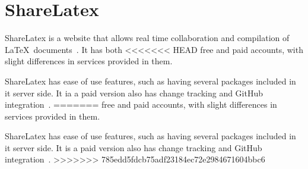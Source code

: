 \section{ShareLatex}

ShareLatex is a website that allows real time collaboration and compilation
of \LaTeX~documents~\cite{www-hid-sp18-601-slatex-documentation}. It has both 
<<<<<<< HEAD
free and paid accounts, with slight differences
 in services provided in them.
 
ShareLatex has ease of use features, such as having several packages included 
in it server side. It ia a paid version also has change tracking and GitHub
integration~\cite{www-hid-sp18-601-slatex-plans}.
=======
free and paid accounts, with slight differences in services provided in them.
 
ShareLatex has ease of use features, such as having several packages included 
in it server side. It is a paid version also has change tracking and GitHub
integration~\cite{www-hid-sp18-601-slatex-plans}.
>>>>>>> 785edd5fdcb75adf23184ec72e2984671604bbc6
